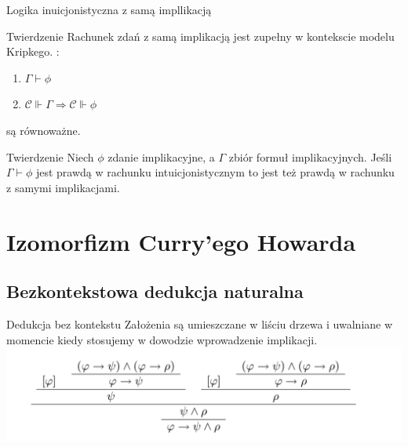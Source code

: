 \documentclass{beamer}
\begin{document}
\begin{frame}{Logika inuicjonistyczna z samą impllikacją}
 \begin{block}{Twierdzenie}
Rachunek zdań z samą implikacją jest zupełny w kontekscie modelu Kripkego. : 
\begin{enumerate}
\item \( \Gamma \vdash \phi \)
\item \( \mathcal{C} \Vdash \Gamma \Rightarrow \mathcal{C} \Vdash \phi \)
\end{enumerate}
są równoważne.
	
 \end{block}
 
  \begin{block}{Twierdzenie}
  Niech \(\phi\) zdanie implikacyjne, a \(\Gamma\) zbiór formuł implikacyjnych. Jeśli \( \Gamma \vdash \phi \) jest prawdą w rachunku intuicjonistycznym to jest też prawdą w rachunku z samymi implikacjami. 

 \end{block}
\end{frame}

\section{Izomorfizm Curry'ego Howarda}

\subsection{Bezkontekstowa dedukcja naturalna}
\begin{frame}{Dedukcja bez kontekstu}
Założenia są umieszczane w liściu drzewa i uwalniane w momencie kiedy stosujemy w dowodzie wprowadzenie implikacji.
\includegraphics[scale=0.25]{bezkontdedukcja.png}
\end{frame}
\end{document}
